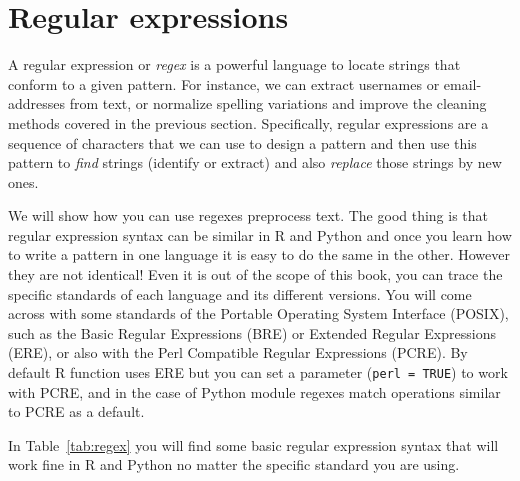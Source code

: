 \section{Regular expressions}
\label{sec:regular}

A regular expression or \emph{regex} is a powerful language to locate strings that conform to a given pattern. For instance, we can extract usernames or email-addresses from text, or normalize spelling variations and improve the cleaning methods covered in the previous section. Specifically, regular expressions are a sequence of characters that we can use to design a pattern and then use this pattern to \emph{find} strings (identify or extract) and also \emph{replace} those strings by new ones. 

We will show how you can use regexes preprocess text. The good thing is that regular expression syntax can be similar in R and Python and once you learn how to write a pattern in one language it is easy to do the same in the other.  However they are not identical! Even it is out of the scope of this book, you can trace the specific standards of each language and its different versions. You will come across with some standards of the Portable Operating System Interface (POSIX), such as the Basic Regular Expressions (BRE) or Extended Regular Expressions (ERE), or also with the Perl Compatible Regular Expressions (PCRE).  By default R function  uses ERE but you can set a parameter (\verb|perl = TRUE|) to work with PCRE, and in the case of Python  module regexes match operations similar to PCRE as a default.

In Table~\ref{tab:regex} you will find some basic regular expression syntax that will work fine in R and Python no matter the specific standard you are using.


